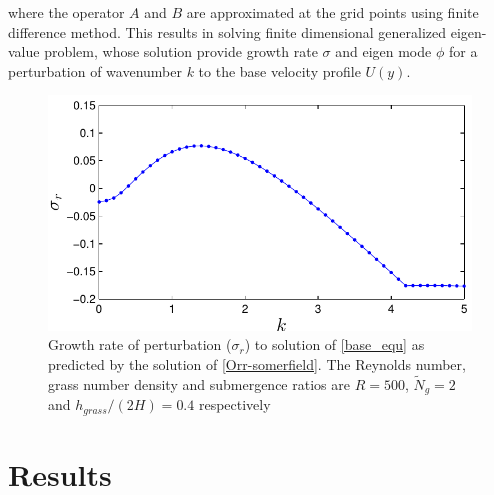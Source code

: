\documentclass[12pt]{report}   %
\newcommand{\Ndg}{\tilde{N}_g}
\begin{document}
where the operator $A$ and $B$ are approximated at the grid points using finite difference method. This results in solving finite dimensional generalized eigen-value problem, whose solution provide growth rate $\sigma$ and eigen mode $\phi$ for a perturbation of wavenumber $k$ to the base velocity profile $U(y)$.  
\begin{figure}
 \centerline{\includegraphics{GrowthrateVsK}}
 \caption{Growth rate of perturbation ($\sigma_r$) to solution of \eqref{base_equ} as predicted by the solution of \eqref{Orr-somerfield}. The  Reynolds number, grass number density and submergence ratios are $R=500$, $\Ndg=2$ and $h_{grass}/(2H) = 0.4$ respectively }
\end{figure}


%
\clearpage{\pagestyle{empty}\cleardoublepage}

\chapter{Results}
\end{document}
